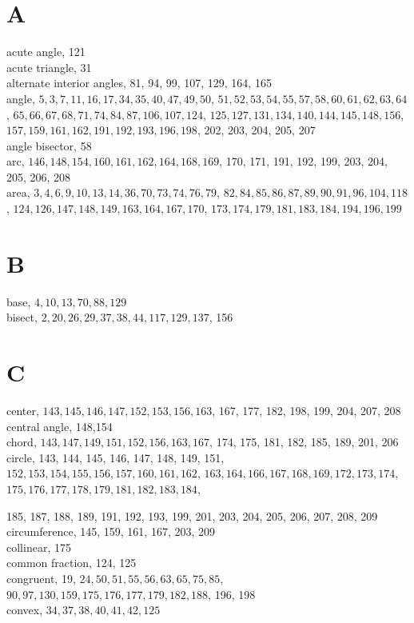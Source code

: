 \documentclass[10pt]{article}
\begin{document}
\section*{A}
acute angle, 121\\
acute triangle, 31\\
alternate interior angles, 81, 94, 99, 107, 129, 164, 165\\
angle, \(5,3,7,11,16,17,34,35,40,47,49,50\), \(51,52,53,54,55,57,58,60,61,62,63,64\), \(65,66,67,68,71,74,84,87,106,107,124\), \(125,127,131,134,140,144,145,148,156\), \(157,159,161,162,191,192,193,196,198\), 202, 203, 204, 205, 207\\
angle bisector, 58\\
arc, \(146,148,154,160,161,162,164,168,169\), 170, 171, 191, 192, 199, 203, 204, 205, 206, 208\\
area, \(3,4,6,9,10,13,14,36,70,73,74,76,79\), \(82,84,85,86,87,89,90,91,96,104,118\), \(124,126,147,148,149,163,164,167,170\), \(173,174,179,181,183,184,194,196,199\)

\section*{B}
base, \(4,10,13,70,88,129\)\\
bisect, \(2,20,26,29,37,38,44,117,129,137\), 156

\section*{C}
center, \(143,145,146,147,152,153,156,163\), 167, 177, 182, 198, 199, 204, 207, 208\\
central angle, 148,154\\
chord, \(143,147,149,151,152,156,163,167\), 174, 175, 181, 182, 185, 189, 201, 206\\
circle, 143, 144, 145, 146, 147, 148, 149, 151, \(152,153,154,155,156,157,160,161,162\), \(163,164,166,167,168,169,172,173,174\), \(175,176,177,178,179,181,182,183,184\),

185, 187, 188, 189, 191, 192, 193, 199, 201, 203, 204, 205, 206, 207, 208, 209\\
circumference, 145, 159, 161, 167, 203, 209\\
collinear, 175\\
common fraction, 124, 125\\
congruent, 19, \(24,50,51,55,56,63,65,75,85\), \(90,97,130,159,175,176,177,179,182,188\), 196, 198\\
convex, \(34,37,38,40,41,42,125\)
\end{document}
